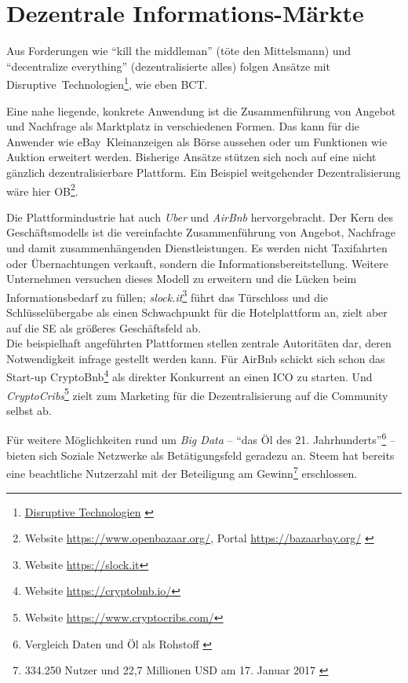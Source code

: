 
\section{Dezentrale Informations-Märkte}

Aus Forderungen wie \enquote{kill the middleman} (töte den Mittelsmann) und \enquote{decentralize everything} (dezentralisierte alles) folgen Ansätze mit \mbox{Disruptive Technologien}\footnote{\href{http://wirtschaftslexikon.gabler.de/Definition/disruptive-technologien.html}{Disruptive Technologien} \autocite{w:lexika-econimics}}, wie eben \gls{BCT}.

Eine nahe liegende, konkrete Anwendung ist die Zusammenführung von Angebot und Nachfrage als Marktplatz in verschiedenen Formen. Das kann für die Anwender wie \mbox{eBay Kleinanzeigen} als Börse aussehen oder um Funktionen wie Auktion erweitert werden. Bisherige Ansätze stützen sich noch auf eine nicht gänzlich dezentralisierbare Plattform. Ein Beispiel weitgehender Dezentralisierung wäre hier \gls{OB}\footnote{Website \url{https://www.openbazaar.org/}, Portal \url{https://bazaarbay.org/} \autocite{w:openbazaar}}.

Die Plattformindustrie hat auch \emph{Uber} und \emph{AirBnb} hervorgebracht. Der Kern des Geschäftsmodells ist die vereinfachte Zusammenführung von Angebot, Nachfrage und damit zusammenhängenden Dienstleistungen. Es werden nicht Taxifahrten oder Übernachtungen verkauft, sondern die Informationsbereitstellung. Weitere Unternehmen versuchen dieses Modell zu erweitern und die Lücken beim Informationsbedarf zu füllen; \emph{slock.it}\footnote{Website \url{https://slock.it}} führt das Türschloss und die Schlüsselübergabe als einen Schwachpunkt für die Hotelplattform an, zielt aber auf die \gls{SE} als größeres Geschäftsfeld ab.\\
Die beispielhaft angeführten Plattformen stellen zentrale Autoritäten dar, deren Notwendigkeit infrage gestellt werden kann. Für AirBnb schickt sich schon das Start-up CryptoBnb\footnote{Website \url{https://cryptobnb.io/}} als direkter Konkurrent an einen \gls{ICO} zu starten. Und \emph{CryptoCribs}\footnote{Website \url{https://www.cryptocribs.com/}} zielt zum Marketing für die Dezentralisierung auf die Community selbst ab.

Für weitere Möglichkeiten rund um \emph{Big Data}%
 -- \enquote{das Öl des 21. Jahrhunderts}\footnote{Vergleich Daten und Öl als Rohstoff \autocite{b:spitz-daten}} -- bieten sich Soziale Netzwerke als Betätigungsfeld geradezu an. Steem hat bereits eine beachtliche Nutzerzahl mit der Beteiligung am Gewinn\footnote{334.250 Nutzer und 22,7 Millionen USD am 17. Januar 2017 \autocite{w:steem}} erschlossen. 

